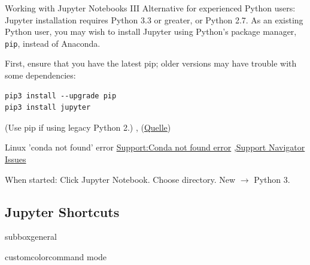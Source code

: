 \documentclass[10pt,a4paper]{article}
\begin{document}
\begin{multicols}{3}
\begin{textbox}{Working with Jupyter Notebooks III}
Alternative for experienced Python users: 
Jupyter installation requires Python 3.3 or greater, or Python 2.7. \punkti 
As an existing Python user, you may wish to install Jupyter using Python’s package manager, \texttt{pip}, instead of Anaconda.

First, ensure that you have the latest pip; older versions may have trouble with some dependencies:
\begin{verbatim}
pip3 install --upgrade pip
pip3 install jupyter
\end{verbatim}
(Use pip if using legacy Python 2.) \sep 
(\href{https://jupyter.readthedocs.io/en/latest/install.html#new-to-python-and-jupyter}{Quelle})

\end{textbox}

\begin{textbox}{Linux 'conda not found' error}
\href{https://support.anaconda.com/hc/en-us/articles/360023863234-Conda-command-not-found-error}{Support:Conda not found error} \sep \href{https://support.anaconda.com/hc/en-us/articles/360024042553-Anaconda-Navigator-Issues-Launching-or-Initializing}{Support Navigator Issues}


When started: Click Jupyter Notebook. Choose directory. New $\to$ Python 3.
\end{textbox}


\subsection{Jupyter Shortcuts}
\begin{multibox}{2} %
\begin{subbox}{subbox}{general}


\end{subbox}
\begin{subbox}{customcolor}{command mode}


\end{subbox}
\end{multibox}
\end{multicols}
\end{document}
